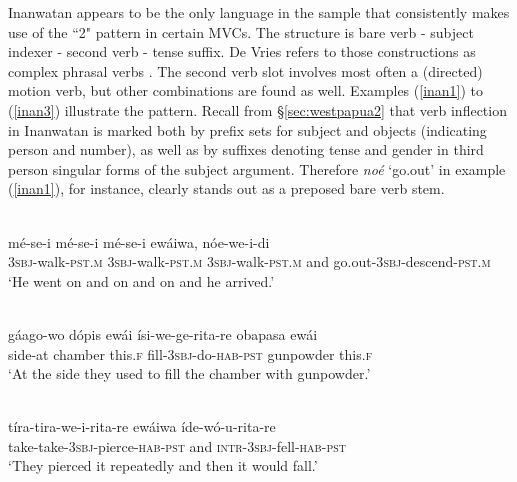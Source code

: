 Inanwatan appears to be the only language in the sample that consistently makes use of the ``2" pattern in certain MVCs. The structure is bare verb - subject indexer - second verb - tense suffix. De Vries refers to those constructions as complex phrasal verbs \citep[57]{devries2004}. The second verb slot involves most often a (directed) motion verb, but other combinations are found as well. Examples (\ref{inan1}) to (\ref{inan3}) illustrate the pattern. Recall from §\ref{sec:westpapua2} that verb inflection in Inanwatan is marked both by prefix sets for subject and objects (indicating person and number), as well as by suffixes denoting tense and gender in third person singular forms of the subject argument. Therefore \textit{noé} `go.out' in example (\ref{inan1}), for instance, clearly stands out as a preposed bare verb stem.

\ea \label{inan1}
\\
\gll mé-se-i mé-se-i mé-se-i ewáiwa, nóe-we-i-di \\
3\textsc{sbj}-walk-\textsc{pst}.\textsc{m} 3\textsc{sbj}-walk-\textsc{pst}.\textsc{m} 3\textsc{sbj}-walk-\textsc{pst}.\textsc{m} and go.out-3\textsc{sbj}-descend-\textsc{pst}.\textsc{m} \\
\glft `He went on and on and on and he arrived.' \\ 
\z

\ea \label{inan2}
\\
\gll gáago-wo dópis ewái ísi-we-ge-rita-re obapasa ewái \\
side-at chamber this.\textsc{f} fill-3\textsc{sbj}-do-\textsc{hab}-\textsc{pst} gunpowder this.\textsc{f} \\
\glft `At the side they used to fill the chamber with gunpowder.'\\ 
\z

\ea \label{inan3}
\\
\gll tíra-tira-we-i-rita-re ewáiwa íde-wó-u-rita-re \\
take-take-3\textsc{sbj}-pierce-\textsc{hab}-\textsc{pst} and \textsc{intr}-3\textsc{sbj}-fell-\textsc{hab}-\textsc{pst} \\
\glft `They pierced it repeatedly and then it would fall.'\\ 
\z

